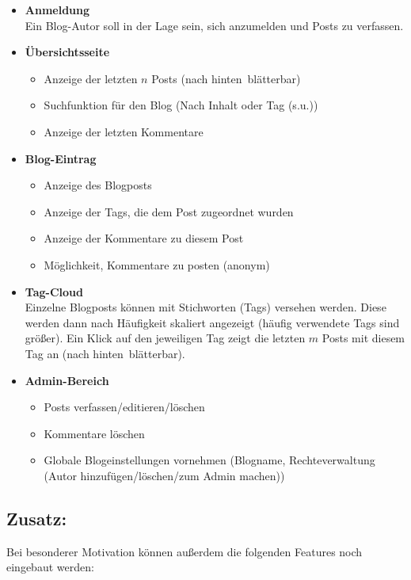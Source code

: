 \documentclass[10pt,a4paper]{article}
\begin{document}
\begin{itemize}
 \item \textbf{Anmeldung}\\
       Ein Blog-Autor soll in der Lage sein, sich anzumelden und Posts zu verfassen.
 \item \textbf{Übersichtsseite}
       \begin{itemize}
        \item Anzeige der letzten $n$ Posts (nach \glqq hinten\grqq\ blätterbar)
        \item Suchfunktion für den Blog (Nach Inhalt oder Tag (s.u.))
        \item Anzeige der letzten Kommentare
       \end{itemize}
 \item \textbf{Blog-Eintrag}
       \begin{itemize}
        \item Anzeige des Blogposts
        \item Anzeige der Tags, die dem Post zugeordnet wurden
        \item Anzeige der Kommentare zu diesem Post
        \item Möglichkeit, Kommentare zu posten (anonym)
       \end{itemize}
 \item \textbf{Tag-Cloud}\\
       Einzelne Blogposts können mit Stichworten (Tags) versehen werden. Diese werden dann nach Häufigkeit skaliert angezeigt (häufig verwendete Tags sind größer). Ein Klick auf den jeweiligen Tag zeigt die letzten $m$ Posts mit diesem Tag an (nach \glqq hinten\grqq \ blätterbar).
 \item \textbf{Admin-Bereich}
       \begin{itemize}
        \item Posts verfassen/editieren/löschen
        \item Kommentare löschen
        \item Globale Blogeinstellungen vornehmen (Blogname, Rechteverwaltung (Autor hinzufügen/löschen/zum Admin machen))
       \end{itemize}
\end{itemize}


\subsection*{Zusatz:}

Bei besonderer Motivation können außerdem die folgenden Features noch eingebaut werden:
\end{document}
